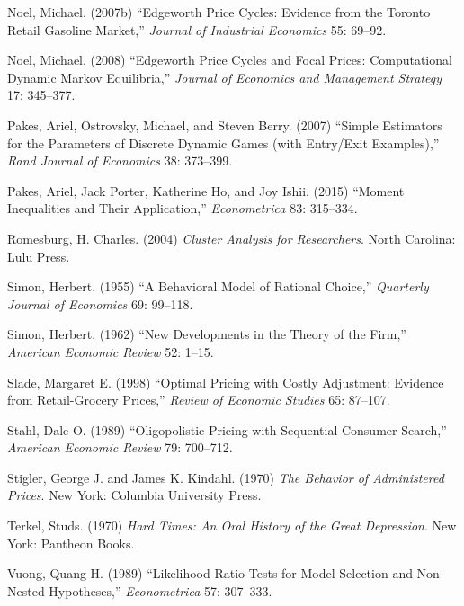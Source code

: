 \documentclass[11pt]{article}
\begin{document}
\begin{description}
\item Noel, Michael. (2007b) ``Edgeworth Price Cycles: Evidence from
  the Toronto Retail Gasoline Market,'' {\it Journal of Industrial
    Economics} 55: 69--92.

\item Noel, Michael. (2008) ``Edgeworth Price Cycles and Focal Prices:
  Computational Dynamic Markov Equilibria,'' {\em Journal of Economics
    and Management Strategy} 17: 345--377.

\item Pakes, Ariel, Ostrovsky, Michael, and Steven Berry. (2007)
  ``Simple Estimators for the Parameters of Discrete Dynamic Games
  (with Entry/Exit Examples),'' {\em Rand Journal of Economics} 38:
  373--399.

\item Pakes, Ariel, Jack Porter, Katherine Ho, and Joy Ishii. (2015)
  ``Moment Inequalities and Their Application,'' {\it Econometrica}
  83: 315--334.

\item Romesburg, H. Charles. (2004) {\it Cluster Analysis for
  Researchers}. North Carolina: Lulu Press.

\item Simon, Herbert. (1955) ``A Behavioral Model of Rational
  Choice,'' {\it Quarterly Journal of Economics} 69: 99--118.

\item Simon, Herbert. (1962) ``New Developments in the Theory of the
  Firm,'' {\it American Economic Review} 52: 1--15.

\item Slade, Margaret E. (1998) ``Optimal Pricing with Costly
  Adjustment: Evidence from Retail-Grocery Prices,'' {\it Review of
    Economic Studies} 65: 87--107.

\item Stahl, Dale O. (1989) ``Oligopolistic Pricing with Sequential
  Consumer Search,'' {\it American Economic Review} 79: 700--712.

\item Stigler, George J. and James K. Kindahl. (1970) {\it The
  Behavior of Administered Prices}. New York: Columbia University
  Press.

\item Terkel, Studs. (1970) {\it Hard Times: An Oral History of the
  Great Depression}. New York: Pantheon Books.

\item Vuong, Quang H. (1989) ``Likelihood Ratio Tests for Model
  Selection and Non-Nested Hypotheses,'' {\em Econometrica} 57:
  307--333.


\end{description}
\end{document}

